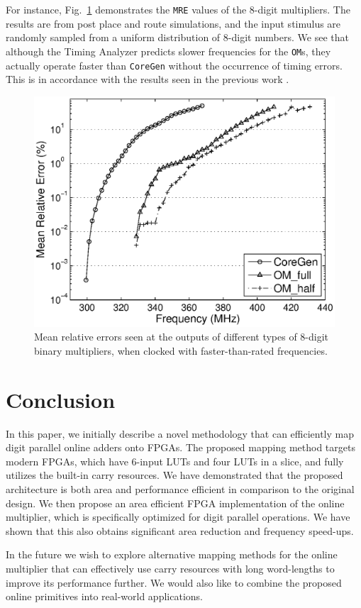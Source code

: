 \documentclass[conference]{IEEEtran}
\begin{document}
For instance, Fig.~\ref{Fig:PM_MRE} demonstrates the \texttt{MRE} values of the 8-digit multipliers. The results are from post place and route simulations, and the input stimulus are randomly sampled from a uniform distribution of 8-digit numbers. We see that although the Timing Analyzer predicts slower frequencies for the \texttt{OM}s, they actually operate faster than \texttt{CoreGen} without the occurrence of timing errors. This is in accordance with the results seen in the previous work \cite{SKDAC14}.

\begin{figure}[tbp]
  \centering
  \includegraphics[width=.48\textwidth]{./Figures/Exp/MRE_PM.eps}
  \vspace{-3ex}
  \caption{Mean relative errors seen at the outputs of different types of 8-digit binary multipliers, when clocked with faster-than-rated frequencies.}
  \label{Fig:PM_MRE}
  \vspace{-1ex}
\end{figure}




\section{Conclusion}
In this paper, we initially describe a novel methodology that can efficiently map digit parallel online adders onto FPGAs. The proposed mapping method targets modern FPGAs, which have 6-input LUTs and four LUTs in a slice, and fully utilizes the built-in carry resources. We have demonstrated  that the proposed architecture is both area and performance efficient in comparison to the original design. We then propose an area efficient FPGA implementation of the online multiplier, which is specifically optimized for digit parallel operations. We have shown that this also obtains significant area reduction and frequency speed-ups.

In the future we wish to explore alternative mapping methods for the online multiplier that can effectively use carry resources with long word-lengths to improve  its performance further. We would also like to combine the proposed online primitives into real-world applications.
\end{document}
